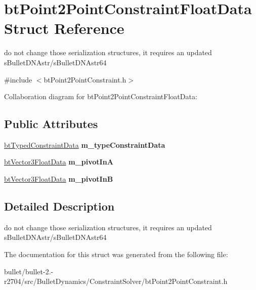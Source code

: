 \hypertarget{structbt_point2_point_constraint_float_data}{\section{bt\+Point2\+Point\+Constraint\+Float\+Data Struct Reference}
\label{structbt_point2_point_constraint_float_data}
}


do not change those serialization structures, it requires an updated s\+Bullet\+D\+N\+Astr/s\+Bullet\+D\+N\+Astr64  




{\ttfamily \#include $<$bt\+Point2\+Point\+Constraint.\+h$>$}



Collaboration diagram for bt\+Point2\+Point\+Constraint\+Float\+Data\+:
\subsection*{Public Attributes}
\begin{DoxyCompactItemize}
\item 
\hypertarget{structbt_point2_point_constraint_float_data_a0da0bba346e0d1107c25d5b71ad69051}{\hyperlink{structbt_typed_constraint_data}{bt\+Typed\+Constraint\+Data} {\bfseries m\+\_\+type\+Constraint\+Data}}\label{structbt_point2_point_constraint_float_data_a0da0bba346e0d1107c25d5b71ad69051}

\item 
\hypertarget{structbt_point2_point_constraint_float_data_ad9db453681a9e2135a9a73dde686e13a}{\hyperlink{structbt_vector3_float_data}{bt\+Vector3\+Float\+Data} {\bfseries m\+\_\+pivot\+In\+A}}\label{structbt_point2_point_constraint_float_data_ad9db453681a9e2135a9a73dde686e13a}

\item 
\hypertarget{structbt_point2_point_constraint_float_data_a32f38e4405e9fb7108ff0731c50b7476}{\hyperlink{structbt_vector3_float_data}{bt\+Vector3\+Float\+Data} {\bfseries m\+\_\+pivot\+In\+B}}\label{structbt_point2_point_constraint_float_data_a32f38e4405e9fb7108ff0731c50b7476}

\end{DoxyCompactItemize}


\subsection{Detailed Description}
do not change those serialization structures, it requires an updated s\+Bullet\+D\+N\+Astr/s\+Bullet\+D\+N\+Astr64 

The documentation for this struct was generated from the following file\+:\begin{DoxyCompactItemize}
\item 
bullet/bullet-\/2.-\/r2704/src/\+Bullet\+Dynamics/\+Constraint\+Solver/bt\+Point2\+Point\+Constraint.\+h\end{DoxyCompactItemize}
